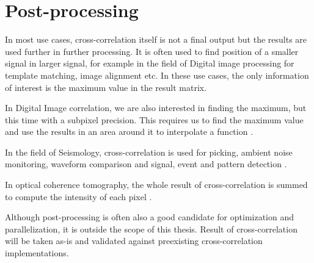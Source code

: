 \section{Post-processing}

In most use cases, cross-correlation itself is not a final output but the results are used further in further processing. It is often used to find position of a smaller signal in larger signal, for example in the field of Digital image processing for template matching, image alignment etc. In these use cases, the only information of interest is the maximum value in the result matrix. 

In Digital Image correlation, we are also interested in finding the maximum, but this time with a subpixel precision. This requires us to find the maximum value and use the results in an area around it to interpolate a function \citep{zhang2015} \citep{misko}.

In the field of Seismology, cross-correlation is used for picking, ambient noise monitoring, waveform comparison and signal, event and pattern detection \citep{Ventosa2019}.
 
In optical coherence tomography, the whole result of cross-correlation is summed to compute the intensity of each pixel \citep{Kapinchev2015}. 

Although post-processing is often also a good candidate for optimization and parallelization, it is outside the scope of this thesis. Result of cross-correlation will be taken as-is and validated against preexisting cross-correlation implementations.


